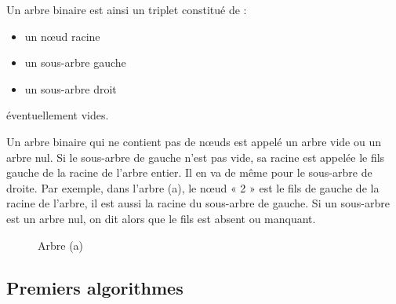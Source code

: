 \documentclass{report}
\begin{document}
Un arbre binaire est ainsi un triplet constitué de :
\begin{itemize}
\item un nœud racine
\item un sous-arbre gauche
\item un sous-arbre droit
\end{itemize}
éventuellement vides.

Un arbre binaire qui ne contient pas de nœuds est appelé un arbre vide ou un arbre nul.
Si le sous-arbre de gauche n'est pas vide, sa racine est appelée le fils gauche de la racine de l'arbre entier. Il en va de même pour le sous-arbre de droite.
Par exemple, dans l'arbre (a), le nœud « 2 » est le fils de gauche de la racine de l'arbre, il est aussi la racine du sous-arbre de gauche.
Si un sous-arbre est un arbre nul, on dit alors que le fils est absent ou manquant.
\begin{figure}[h]
\begin{center}
\end{center}
\caption{Arbre (a)} \label{fig:Exemples d'arbres}
\end{figure}

\subsection{Premiers algorithmes}
\end{document}
